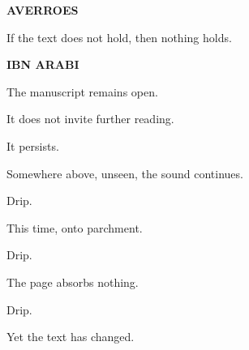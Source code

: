 \textbf{AVERROES}

If the text does not hold, then nothing holds.

\medskip

\textbf{IBN ARABI}


\medskip

The manuscript remains open.

It does not invite further reading.

It persists.

\medskip

Somewhere above, unseen, the sound continues.

\medskip

Drip.

\medskip

This time, onto parchment.

\medskip

Drip.

\medskip

The page absorbs nothing.

\medskip

Drip.

\medskip

Yet the text has changed.
